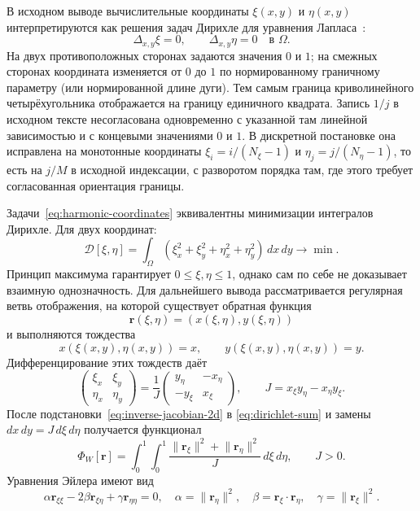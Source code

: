 \documentclass[11pt,a4paper]{article}
\newcommand{\vect}[1]{\boldsymbol{#1}}
\begin{document}
В исходном выводе вычислительные координаты \(\xi(x,y)\) и \(\eta(x,y)\)
интерпретируются как решения задач Дирихле для уравнения
Лапласа~\cite{tikhonov1999}:
\begin{equation}
\Delta_{x,y}\xi=0,\qquad \Delta_{x,y}\eta=0
\quad\text{в }\Omega.
\label{eq:harmonic-coordinates}
\end{equation}
На двух противоположных сторонах задаются значения \(0\) и \(1\);
на смежных сторонах координата изменяется от \(0\) до \(1\) по
нормированному граничному параметру (или нормированной длине дуги).
Тем самым граница криволинейного четырёхугольника отображается на
границу единичного квадрата. Запись \(1/j\) в исходном тексте
несогласована одновременно с указанной там линейной зависимостью и с
концевыми значениями \(0\) и \(1\). В дискретной постановке она
исправлена на монотонные координаты
\(\xi_i=i/(N_\xi-1)\) и \(\eta_j=j/(N_\eta-1)\), то есть на
\(j/M\) в исходной индексации, с разворотом порядка там, где этого
требует согласованная ориентация границы.

Задачи~\eqref{eq:harmonic-coordinates} эквивалентны минимизации
интегралов Дирихле. Для двух координат:
\begin{equation}
\mathcal D[\xi,\eta]
=\int_\Omega
\left(
\xi_x^2+\xi_y^2+\eta_x^2+\eta_y^2
\right)\,dx\,dy
\longrightarrow\min .
\label{eq:dirichlet-sum}
\end{equation}
Принцип максимума гарантирует \(0\le\xi,\eta\le1\), однако сам по себе
не доказывает взаимную однозначность. Для дальнейшего вывода
рассматривается регулярная ветвь отображения, на которой существует
обратная функция
\[
\vect r(\xi,\eta)=(x(\xi,\eta),y(\xi,\eta))
\]
и выполняются тождества
\[
x(\xi(x,y),\eta(x,y))=x,\qquad
y(\xi(x,y),\eta(x,y))=y.
\]
Дифференцирование этих тождеств даёт
\begin{equation}
\begin{pmatrix}
\xi_x&\xi_y\\
\eta_x&\eta_y
\end{pmatrix}
=\frac1J
\begin{pmatrix}
y_\eta&-x_\eta\\
-y_\xi&x_\xi
\end{pmatrix},
\qquad
J=x_\xi y_\eta-x_\eta y_\xi.
\label{eq:inverse-jacobian-2d}
\end{equation}
После подстановки~\eqref{eq:inverse-jacobian-2d} в
\eqref{eq:dirichlet-sum} и замены \(dx\,dy=J\,d\xi\,d\eta\) получается
функционал
\begin{equation}
\Phi_W[\vect r]=
\int_0^1\!\!\int_0^1
\frac{\lVert\vect r_\xi\rVert^2+\lVert\vect r_\eta\rVert^2}{J}
\,d\xi\,d\eta,\qquad J>0 .
\label{eq:winslow-functional}
\end{equation}
Уравнения Эйлера имеют вид
\begin{equation}
\alpha\vect r_{\xi\xi}-2\beta\vect r_{\xi\eta}
+\gamma\vect r_{\eta\eta}=0,
\quad
\alpha=\lVert\vect r_\eta\rVert^2,\quad
\beta=\vect r_\xi\!\cdot\!\vect r_\eta,\quad
\gamma=\lVert\vect r_\xi\rVert^2 .
\label{eq:winslow-pde}
\end{equation}
\end{document}
